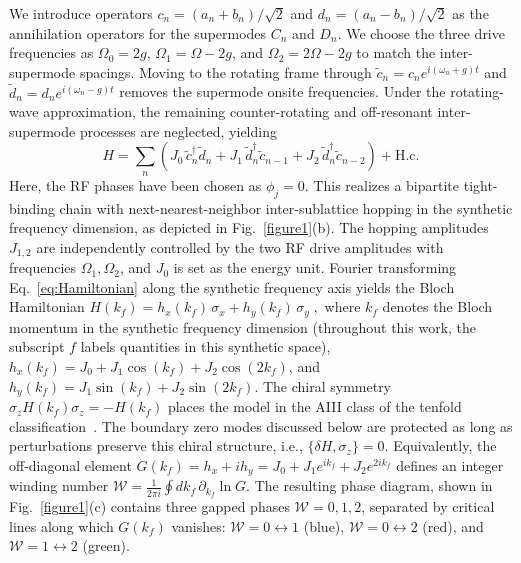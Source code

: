 \documentclass[aps,prl,twocolumn,preprintnumbers,amsmath,amssymb,superscriptaddress,10pt]{revtex4-2}
\begin{document}
We introduce operators $c_n = (a_n + b_n)/\sqrt{2}$ and $d_n = (a_n - b_n)/\sqrt{2}$ as the annihilation operators for the supermodes $C_n$ and $D_n$. We choose the three drive frequencies as $\Omega_0 = 2g$, $\Omega_1 = \Omega - 2g$, and $\Omega_2 = 2\Omega - 2g$ to match the inter-supermode spacings. Moving to the rotating frame through $\tilde c_n=c_ne^{i(\omega_n+g)t}$ and $\tilde d_n=d_ne^{i(\omega_n-g)t}$ removes the supermode onsite frequencies. Under the rotating-wave approximation, the remaining counter-rotating and off-resonant inter-supermode processes are neglected, yielding
\begin{equation}\label{eq:Hamiltonian}
      H = \sum_{n} \left( J_0\, \tilde{c}^{\dagger}_{n} \tilde{d}_{n} + J_1\, \tilde{d}^{\dagger}_{n} \tilde{c}_{n-1} + J_2\, \tilde{d}^{\dagger}_{n} \tilde{c}_{n-2}\right) + \mathrm{H.c.}
\end{equation}
Here, the RF phases have been chosen as $\phi_j=0$. This realizes a bipartite tight-binding chain with next-nearest-neighbor inter-sublattice hopping in the synthetic frequency dimension, as depicted in Fig.~\ref{figure1}(b). The hopping amplitudes $J_{1,2}$ are independently controlled by the two RF drive amplitudes with frequencies $\Omega_1, \Omega_2$, and $J_0$ is set as the energy unit. Fourier transforming Eq.~\eqref{eq:Hamiltonian} along the synthetic frequency axis yields the Bloch Hamiltonian $H(k_f) = h_x(k_f)\, \sigma_x + h_y(k_f)\, \sigma_y \;,$
where $k_f$ denotes the Bloch momentum in the synthetic frequency dimension (throughout this work, the subscript $f$ labels quantities in this synthetic space), $h_x(k_f) = J_0 + J_1 \cos(k_f) + J_2\cos(2k_f)$, and $h_y(k_f) = J_1 \sin(k_f) + J_2 \sin(2k_f)$. The chiral symmetry $\sigma_z H(k_f) \sigma_z = -H(k_f)$ places the model in the AIII class of the tenfold classification~\cite{ChiuTeo2016,ryu2010topological}. The boundary zero modes discussed below are protected as long as
perturbations preserve this chiral structure, i.e.,
$\{\delta H,\sigma_z\}=0$. Equivalently, the off-diagonal element $G(k_f) = h_x + ih_y = J_0 + J_1 e^{ik_f} + J_2 e^{2ik_f}$ defines an integer winding number $\mathcal{W} = \frac{1}{2\pi i}\oint dk_f\, \partial_{k_f}\ln G$. The resulting phase diagram, shown in Fig.~\ref{figure1}(c) contains three gapped phases $\mathcal{W}=0,1,2$, separated by critical lines along which $G(k_f)$ vanishes: $\mathcal{W}=0\leftrightarrow1$ (blue), $\mathcal{W}=0 \leftrightarrow 2$ (red), and $\mathcal{W}=1\leftrightarrow 2$ (green).

\end{document}
